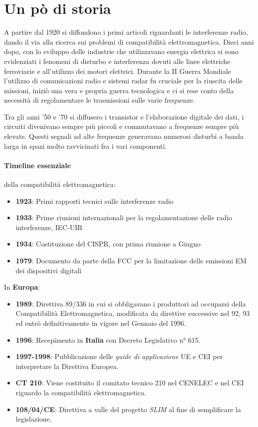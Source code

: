 \section{Un pò di storia}
A partire dal 1920 si diffondono i primi articoli riguardanti le interferenze radio, dando il via alla ricerca
sui problemi di compatibilità elettromagnetica.
Dieci anni dopo, con lo sviluppo delle industrie che utilizzavano energia elettrica si sono evidenziati i fenomeni
di disturbo e interferenza dovuti alle linee elettriche ferroviarie e all'utilizzo dei motori elettrici.
Durante la II Guerra Mondiale l'utilizzo di comunicazioni radio e sistemi radar fu cruciale per la riuscita
delle missioni, iniziò una vera e propria guerra tecnologica e ci si rese conto della necessità di regolamentare
le trasmissioni sulle varie frequenze.

Tra gli anni '50 e '70 si diffusero i transistor e l'elaborazione digitale dei dati, i circuiti divenivano
sempre più piccoli e commutavano a frequenze sempre più elevate. Questi segnali ad alte frequenze generavano numerosi
disturbi a banda larga in spazi molto ravvicinati fra i vari componenti.

\paragraph{Timeline essenziale} della compatibilità elettromagnetica:

\begin{itemize}
 \item \textbf{1923}: Primi rapporti tecnici sulle interferenze radio
 \item \textbf{1933}: Prime riunioni internazionali per la regolamentazione delle radio interferenze, IEC-UIR
 \item \textbf{1934}: Costituzione del CISPR, con prima riunione a Giugno
 \item \textbf{1979}: Documento da parte della FCC per la limitazione delle emissioni EM dei dispositivi digitali
\end{itemize}


In \textbf{Europa}: 
\begin{itemize}
 \item \textbf{1989}: Direttiva 89/336 in cui si obbligavano i produttori ad occuparsi della 
 Compatibilità Elettromagnetica, modificata da direttive successive nel 92, 93 ed entrò definitivamente in vigore
 nel Gennaio del 1996.
 \item \textbf{1996}: Recepimento in \textbf{Italia} con Decreto Legislativo n° 615.
 \item \textbf{1997-1998}: Pubblicazione delle \textit{guide di applicazione} UE e CEI per interpretare la Direttiva
 Europea.
 \item \textbf{CT 210}: Viene costituito il comitato tecnico 210 nel CENELEC e nel CEI riguardo la compatibilità
 elettromagnetica.
 \item \textbf{108/04/CE}: Direttiva a valle del progetto \textit{SLIM} al fine di semplificare la legislazione.
\end{itemize}

